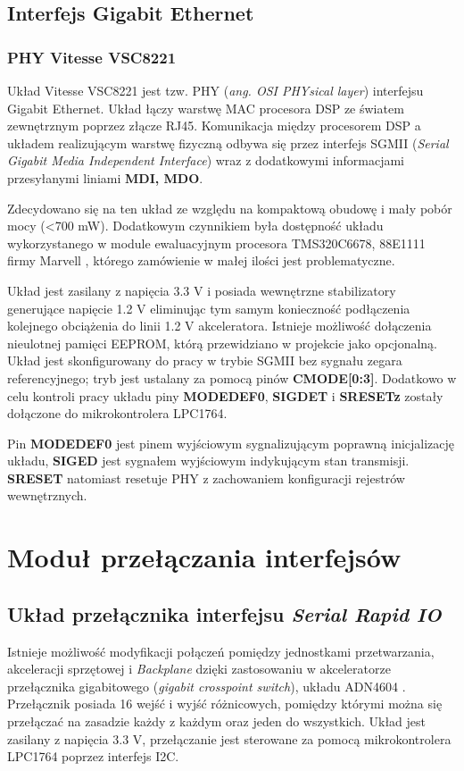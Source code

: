 \subsection{Interfejs Gigabit Ethernet}
\subsubsection{PHY Vitesse VSC8221}
Układ Vitesse VSC8221 \cite{VSC8221} jest tzw. PHY (\textit{ang. OSI PHYsical layer}) interfejsu Gigabit Ethernet. Układ łączy warstwę MAC procesora DSP ze światem zewnętrznym poprzez złącze RJ45. Komunikacja między procesorem DSP a układem realizującym warstwę fizyczną odbywa się przez interfejs SGMII (\textit{Serial Gigabit Media Independent Interface}) wraz z dodatkowymi informacjami przesyłanymi liniami \textbf{MDI, MDO}. 

Zdecydowano się na ten układ ze względu na kompaktową obudowę i mały pobór mocy (\textless 700 mW). Dodatkowym czynnikiem była dostępność układu wykorzystanego w module ewaluacyjnym procesora TMS320C6678,  88E1111 \cite{88E1111} firmy Marvell \cite{COMPANY:MARVELL}, którego zamówienie w małej ilości jest problematyczne. 

Układ jest zasilany z napięcia 3.3 V i posiada wewnętrzne stabilizatory generujące napięcie 1.2 V eliminując tym samym konieczność podłączenia kolejnego obciążenia do linii 1.2 V akceleratora. Istnieje możliwość dołączenia nieulotnej pamięci EEPROM, którą przewidziano w projekcie jako opcjonalną. Układ jest skonfigurowany do pracy w trybie SGMII bez sygnału zegara referencyjnego; tryb jest ustalany za pomocą pinów \textbf{CMODE[0:3]}. Dodatkowo w celu kontroli pracy układu piny \textbf{MODEDEF0}, \textbf{SIGDET} i \textbf{SRESETz} zostały dołączone do mikrokontrolera LPC1764. 

 Pin \textbf{MODEDEF0} jest pinem wyjściowym sygnalizującym poprawną inicjalizację układu, \textbf{SIGED} jest sygnałem wyjściowym indykującym stan transmisji. \textbf{SRESET} natomiast resetuje PHY z zachowaniem konfiguracji rejestrów wewnętrznych. 

\section{Moduł przełączania interfejsów}
\subsection{Układ przełącznika interfejsu \textit{Serial Rapid IO} }
Istnieje możliwość modyfikacji połączeń pomiędzy jednostkami przetwarzania, akceleracji sprzętowej i \textit{Backplane} dzięki zastosowaniu w akceleratorze przełącznika gigabitowego (\textit{gigabit crosspoint switch}), układu ADN4604 \cite{ADN4604}. Przełącznik posiada 16 wejść i wyjść różnicowych, pomiędzy którymi można się przełączać na zasadzie każdy z każdym oraz jeden do wszystkich. Układ jest zasilany z napięcia 3.3 V, przełączanie jest sterowane za pomocą mikrokontrolera LPC1764 poprzez interfejs I2C. 

